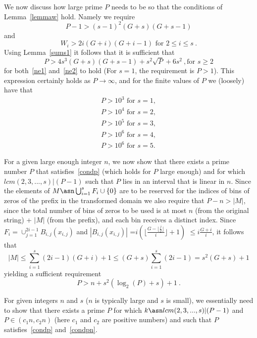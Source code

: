 We now discuss how large prime $P$ needs to be so that the
conditions of Lemma~\ref{lemmaw} hold. Namely we require
\begin{equation}\label{ne1}
P-1> (s-1)^2(G+s)(G+s-1) \end{equation} and
\begin{equation}\label{ne2}W_i>2i(G+i)(G+i-1) \text{ for }2 \leq i \leq s~. \end{equation} Using
Lemma~\ref{sums1} it follows that it is sufficient that
\begin{equation}\label{condp}
P > 4s^3(G+s)(G+s-1)+s^2\sqrt{P}+6s^2~, \text{for } s \geq 2
\end{equation}
for both~\eqref{ne1} and~\eqref{ne2} to hold (For $s=1$, the
requirement is $P>1$). This expression certainly holds as
$P\rightarrow \infty$, and for the finite values of $P$ we
(loosely) have that
\begin{eqnarray*}
P>10^3 \text{ for } s=1, \\P>10^4 \text{ for } s=2, \\P>10^5
\text{ for } s=3,\\ P>10^6 \text{ for } s=4,\\P>10^6 \text{ for }
s=5.
\end{eqnarray*}

 For a given large enough integer $n$, we now show that
there exists a prime number $P$ that satisfies~\eqref{condp}
(which holds for $P$ large enough) and for which $lcm(2,3,...,s) |
(P-1)$ such that $P$ lies in an interval that is linear in $n$.
Since the elements of $M \asn \bigcup_{i=1}^s F_i \cup \{0\}$ are
to be reserved for the indices of bins of zeros of the prefix in
the transformed domain we also require that $P-n > |M|$, since the
total number of bins of zeros to be used is at most $n$ (from the
original string) + $|M|$ (from the prefix), and each bin receives
a distinct index. Since $F_i= \cup_{j=1}^{2i-1} B_{i,j}(x_{i,j})$
and $|B_{i,j}(x_{i,j})|$ =$i\left( \lfloor \frac{G-\lfloor
\frac{j}{2}\rfloor}{i}\rfloor+1\right)$ $\leq i \frac{G+i}{i}$, it
follows that \begin{equation}\label{eqM} |M| \leq \sum_{i=1}^s
(2i-1)(G+i) +1 \leq (G+s) \sum_{i=1}^s (2i-1)
=s^2(G+s)+1\end{equation} yielding a sufficient requirement
\begin{equation}\label{condpn}P>n+s^2(\log_2(P)+s)+1~.
\end{equation}

For given integers $n$ and $s$ ($n$ is typically large and $s$ is
small), we essentially need to show that there exists a prime $P$
for which $k \asn lcm(2,3,...,s) | (P-1)$ and $P \in (c_1n,c_2n)$
(here $c_1$ and $c_2$ are positive numbers) and such that $P$
satisfies~\eqref{condp} and~\eqref{condpn}.

